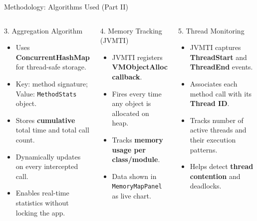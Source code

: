 \documentclass[aspectratio=169]{beamer}
\begin{document}
\begin{frame}{Methodology: Algorithms Used (Part II)}
  \begin{columns}[T]
      \begin{block}{3. Aggregation Algorithm}
        \begin{itemize}\scriptsize\itemsep3pt
          \item Uses \textbf{ConcurrentHashMap} for thread-safe storage.
          \item Key: method signature; Value: \texttt{MethodStats} object.
          \item Stores \textbf{cumulative} total time and total call count.
          \item Dynamically updates on every intercepted call.
          \item Enables real-time statistics without locking the app.
        \end{itemize}
      \end{block}
      \vspace{1pt}
      \begin{block}{4. Memory Tracking (JVMTI)}
        \begin{itemize}\scriptsize\itemsep3pt
          \item JVMTI registers \textbf{VMObjectAlloc callback}.
          \item Fires every time any object is allocated on heap.
          \item Tracks \textbf{memory usage per class/module}.
          \item Data shown in \texttt{MemoryMapPanel} as live chart.
        \end{itemize}
      \end{block}
      \begin{block}{5. Thread Monitoring}
        \begin{itemize}\scriptsize\itemsep3pt
          \item JVMTI captures \textbf{ThreadStart} and \textbf{ThreadEnd} events.
          \item Associates each method call with its \textbf{Thread ID}.
          \item Tracks number of active threads and their execution patterns.
          \item Helps detect \textbf{thread contention} and deadlocks.
        \end{itemize}
      \end{block}

\end{columns}
\end{frame}
\end{document}
